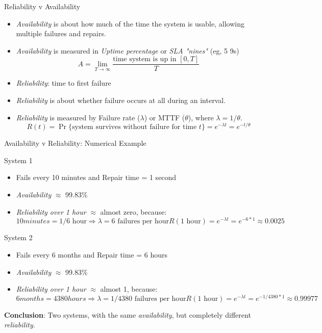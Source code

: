 \begin{frame}{Reliability v Availability}
  \begin{itemize}\firmlist
    \item \emph{Availability} is about how much of the time the system is usable,
          allowing multiple failures and repairs.
    \item \emph{Availability} is measured in \emph{Uptime percentage}
          or \emph{SLA "nines"} (eg, 5 9s)
          \[
            A = \lim_{T \to \infty} \frac{\text{time system is up in } [0, T]}{T}
          \]
    \item \emph{Reliability}: time to first failure
    \item \emph{Reliability} is about whether failure occurs at all
          during an interval.
    \item \emph{Reliability} is measured by Failure rate
          ($\lambda$) or MTTF ($\theta$), where $\lambda = 1/\theta$.
          \[
            R(t) = \Pr\{\text{system survives without failure for time } t\}
            = e^{-\lambda t} = e^{-t/\theta}
          \]
  \end{itemize}
\end{frame}

\begin{frame}{Availability v Reliability: Numerical Example}
  \begin{block}{System 1}
    \begin{itemize}
      \item Fails every 10 minutes and Repair time = 1 second
      \item \emph{Availability} $\approx$ 99.83\%
      \item \emph{Reliability over 1 hour} $\approx$ almost zero, because:
            \[
              10 minutes = 1/6 \text{ hour} \Rightarrow \lambda = 6 \text{ failures per hour}
              R(1\text{ hour}) = e^{-\lambda t} = e^{-6 * 1} \approx 0.0025
            \]
    \end{itemize}
  \end{block}

  \begin{block}{System 2}
    \begin{itemize}
      \item Fails every 6 months and Repair time = 6 hours
      \item \emph{Availability} $\approx$ 99.83\%
      \item \emph{Reliability over 1 hour} $\approx$ almost 1, because:
            \[
              6 months = 4380 hours \Rightarrow \lambda = 1/4380 \text{ failures per hour}
              R(1\text{ hour}) = e^{-\lambda t} = e^{-1/4380 * 1} \approx 0.99977
            \]
    \end{itemize}
  \end{block}
  \textbf{Conclusion}: Two systems, with the same
  \emph{availability}, but completely different
  \emph{reliability}.
\end{frame}

